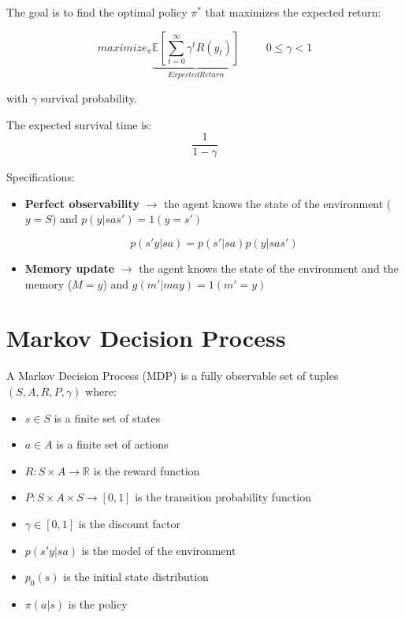 The goal is to find the optimal policy $\pi^*$ that maximizes the expected return:

\[
maximize_{\pi} \underbrace{\mathbb{E} \left[ \sum_{t=0}^{\infty} \gamma^t R(y_t) \right]}_{Expected Return} \hspace{1cm} 0 \leq \gamma < 1
\]

with $\gamma$ survival probability.

The expected survival time is:
\[
    \frac{1}{1 - \gamma}
\]

Specifications:

\begin{itemize}
    \item \textbf{Perfect observability} $\to$ the agent knows the state of the environment ($y = S$) and $p(y|sas') = \mathcal{1}(y = s')$
    \begin{observationblock} 
        $$
        p(s'y|sa) = p(s'|sa)p(y|sas')
        $$
    \end{observationblock}
    \item \textbf{Memory update} $\to$ the agent knows the state of the environment and the memory ($M = y$) and $g(m'|may) = \mathcal{1}(m' = y)$
\end{itemize}

\section{Markov Decision Process}

\begin{definitionblock}
    A Markov Decision Process (MDP) is a fully observable set of tuples $(S, A, R, P, \gamma)$ where:
    \begin{itemize}
        \item $s \in S$ is a finite set of states
        \item $a \in A$ is a finite set of actions
        \item $R: S \times A \to \mathbb{R}$ is the reward function
        \item $P: S \times A \times S \to [0, 1]$ is the transition probability function
        \item $\gamma \in [0, 1]$ is the discount factor
        \item $p(s'y|sa)$ is the model of the environment
        \item $p_0(s)$ is the initial state distribution
        \item $\pi(a|s)$ is the policy
    \end{itemize}
\end{definitionblock}

